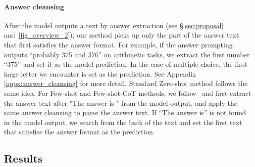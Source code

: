 \documentclass{article}
\newcommand{\theirs}{Few-shot-CoT\xspace}
\newcommand{\theirsz}{Zero-shot\xspace}
\newcommand{\theirsf}{Few-shot\xspace}
\newcommand{\mysection}{\S\xspace}
\begin{document}
\paragraph{Answer cleansing} After the model outputs a text by answer extraction (see \mysection \ref{sec:proposal} and~\autoref{fig_overview_2}), our method picks up only the part of the answer text that first satisfies the answer format. 
For example, if the answer prompting outputs ``probably 375 and 376'' on arithmetic tasks, we extract the first number ``375'' and set it as the model prediction. 
In the case of multiple-choice, the first large letter we encounter is set as the prediction.
See Appendix \ref{appx:answer_cleansing} for more detail.
Standard \theirsz method follows the same idea. 
For \theirsf and \theirs methods, we follow~\citep{cot_wei_sc} and first extract the answer text after "The answer is " from the model output, and apply the same answer cleansing to parse the answer text. 
If ``The answer is'' is not found in the model output, we search from the back of the text and set the first text that satisfies the answer format as the prediction.


\subsection{Results}
\end{document}
